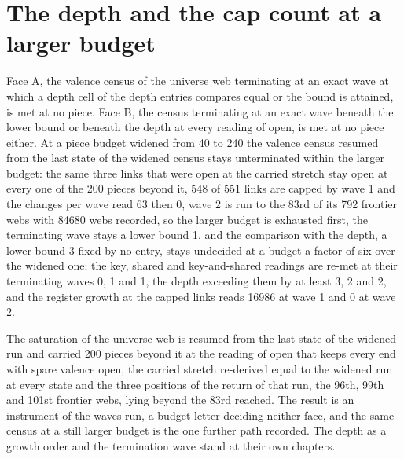 \section{The depth and the cap count at a larger budget}\label{mod:X-4-D540569-w-tlgc}
\begin{chwall}\label{box:X-4-D540569-w-tlgc:1}
Face A, the valence census of the universe web terminating at an exact wave at which a depth cell of the depth entries compares equal or the bound is attained, is met at no piece. Face B, the census terminating at an exact wave beneath the lower bound or beneath the depth at every reading of open, is met at no piece either. At a piece budget widened from 40 to 240 the valence census resumed from the last state of the widened census stays unterminated within the larger budget: the same three links that were open at the carried stretch stay open at every one of the 200 pieces beyond it, 548 of 551 links are capped by wave 1 and the changes per wave read 63 then 0, wave 2 is run to the 83rd of its 792 frontier webs with 84680 webs recorded, so the larger budget is exhausted first, the terminating wave stays a lower bound 1, and the comparison with the depth, a lower bound 3 fixed by no entry, stays undecided at a budget a factor of six over the widened one; the key, shared and key-and-shared readings are re-met at their terminating waves 0, 1 and 1, the depth exceeding them by at least 3, 2 and 2, and the register growth at the capped links reads 16986 at wave 1 and 0 at wave 2.
\end{chwall}
The saturation of the universe web is resumed from the last state of the widened run and carried 200 pieces beyond it at the reading of open that keeps every end with spare valence open, the carried stretch re-derived equal to the widened run at every state and the three positions of the return of that run, the 96th, 99th and 101st frontier webs, lying beyond the 83rd reached. The result is an instrument of the waves run, a budget letter deciding neither face, and the same census at a still larger budget is the one further path recorded. The depth as a growth order and the termination wave stand at their own chapters.
